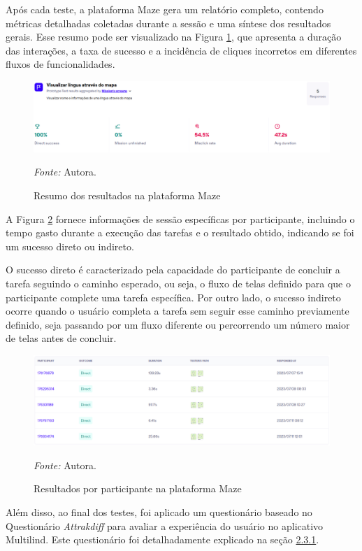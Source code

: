 Após cada teste, a plataforma Maze gera um relatório completo, contendo métricas detalhadas coletadas durante a sessão e uma síntese dos resultados gerais. Esse resumo pode ser visualizado na Figura \ref{fig31}, que apresenta a duração das interações, a taxa de sucesso e 
a incidência de cliques incorretos em diferentes fluxos de funcionalidades.

\begin{figure}[h!]
	\centering
	\caption{Resumo dos resultados na plataforma Maze}
	\begin{adjustbox}{center}
		\includegraphics[width=1\textwidth]{figuras/maze.eps}
	\end{adjustbox}
	\begin{tablenotes}[flushleft]
		\centering
		\item \textit{Fonte:} Autora.
	\end{tablenotes}
	\label{fig31}
\end{figure}

A Figura \ref{fig32} fornece informações de sessão específicas por participante, incluindo o tempo gasto durante a execução das tarefas e o resultado obtido, indicando se foi um sucesso direto ou indireto.

O sucesso direto é caracterizado pela capacidade do participante de concluir a tarefa seguindo o caminho esperado, ou seja, o fluxo de telas definido para que o participante complete uma tarefa específica. Por outro lado, o sucesso indireto ocorre quando o usuário completa a tarefa 
sem seguir esse caminho previamente definido, seja passando por um fluxo diferente ou percorrendo um número maior de telas antes de concluir.

\begin{figure}[h!]
	\centering
	\caption{Resultados por participante na plataforma Maze}
	\begin{adjustbox}{center}
		\includegraphics[width=1\textwidth]{figuras/maze2.eps}
	\end{adjustbox}
	\begin{tablenotes}[flushleft]
		\centering
		\item \textit{Fonte:} Autora.
	\end{tablenotes}
	\label{fig32}
\end{figure}

Além disso, ao final dos testes, foi aplicado um questionário baseado no Questionário \textit{Attrakdiff} para avaliar a experiência do usuário no aplicativo Multilind. Este questionário foi detalhadamente explicado na seção \hyperref[sec:Medicao2]{2.3.1}.